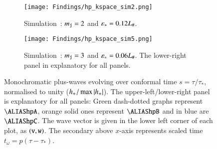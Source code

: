     \begin{figure}[ht!]\ContinuedFloat
        \begin{subfigure}[b]{\linewidth}
            \texttt{[image: Findings/hp\_kspace\_sim2.png]}
        \caption{Simulation~: $m_{\mathtt{j}}=2$ and $\varepsilon_\ast=0.12L_\#$.}
        \label{fig:results:h11:hp_kspace_sim2}
        \end{subfigure}
        \hfill
        \begin{subfigure}[b]{\linewidth}
            \texttt{[image: Findings/hp\_kspace\_sim5.png]}
        \caption{Simulation~: $m_{\mathtt{j}}=3$ and $\varepsilon_\ast=0.06L_\#$. The lower-right panel in explanatory for all panels.}
        \label{fig:results:h11:hp_kspace_sim5}
        \end{subfigure}
        \caption{Monochromatic plus-waves evolving over conformal time $s=\tau/\tau_\ast$, normalised to unity ($h_+/\max{\abs{h_+}}$). The upper-left/lower-right panel is explanatory for all panels: Green dash-dotted graphs represent $\hpA$, orange solid ones represent $\hpB$ and in blue are $\hpC$. The wave vector is given in the lower left corner of each plot, as $(\mathtt{v},\mathtt{w})$. The secondary above $x$-axis represents scaled time $t_\omega =p (\tau-\tau_\ast)$.}
        \label{fig:results:h11:hp_kspace}
    \end{figure}

